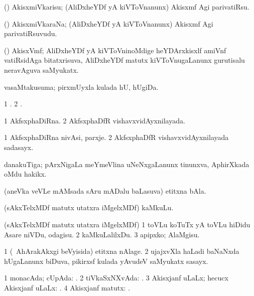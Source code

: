 \bentry
{}
\gl{\sakirx}
\bmng
(\ravi) AkisxmiVkarisu; (AliDxheYDf yA kiVToVnanunx) Akisxmf Agi parivatiRsu. 
\emng
\eentry

\bentry
{}
\gl{\nA}
\bmng
(\ravi) AkisxmiVkaraNa; (AliDxheYDf yA kiVToVnanunx) Akisxmf Agi parivatiRsuvudu. 
\emng
\eentry

\bentry
{}
\gl{\nA}
\bmng
(\ravi) AkisxVmf; AliDxheYDf yA kiVToVninoMdige heYDArxkisxlf amiVnf vatiRsidAga bitatxrisuva, AliDxheYDf matutx kiVToVnugaLanunx gurutisalu neravAguva saMyukatx. 
\emng
\eentry

\bentry
{}
\gl{\nA}
\bmng
vasaMtakusuma; pirxmUyxla kulada hU, hUgiDa. 
\emng
\eentry

\bentry
{}
\gl{\saMkiSx}
\bmng
\bnum
\num{1} . 
\num{2} . 
\enum
\emng
\eentry

\bentry
{}
\gl{\gu}
\bmng
\bnum
\num{1} AkfsxphaDiRna. 
\num{2} AkfsxphaDfR vishavxvidAyxnilayada. 
\enum
\emng
\eentry

\bentry
{}
\gl{\nA}
\bmng
\bnum
\num{1} AkfsxphaDiRna nivAsi, parxje. 
\num{2} AkfsxphaDfR vishavxvidAyxnilayada sadasayx. 
\enum
\emng
\eentry

\bentry
{}
\gl{\nA}
\bmng
danakuTiga; pArxNigaLa meYmeVlina uNeNxgaLanunx tinunxva, AphirXkada oMdu hakikx. 
\emng
\eentry

\bentry
{}
\gl{\nA}
\bmng
(aneVka veVLe mAMsada sAru mADalu baLasuva) etitxna bAla. 
\emng
\eentry

\bentry
{}
\gl{\nA}
\bmng
(sAkxTelxMDf matutx utatxra iMgelxMDf) kaMkuLu. 
\emng
\eentry

\bentry
{}
\gl{\sakirx}
\bmng
(sAkxTelxMDf matutx utatxra iMgelxMDf) 
\bnum
\num{1} toVLu koTuTx yA toVLu hiDidu Asare niVDu, odagisu. 
\num{2} kaMkuLalilxDu. 
\num{3} apipxko; AlaMgisu. 
\enum
\emng
\eentry

\bentry
{}
\gl{\nA}
\bmng
\bnum
\num{1} (\kanmu\ AhArakAkxgi beVyisida) etitxna nAlage. 
\num{2} ujajxvXla haLadi baNaNxda hUgaLanunx biDuva, pikirxsf kulada yAvudeV saMyukatx sasayx. 
\enum
\emng
\eentry

\bentry
{}
\gl{\sapUpa}
\bmng
\bnum
\num{1} monacAda; cUpAda: . 
\num{2} tiVkaSxNXvAda: . 
\num{3} Akisxjanf uLaLx; hecucx Akisxjanf uLaLx: . 
\num{4} Akisxjanf matutx: . 
\enum
\emng
\eentry

